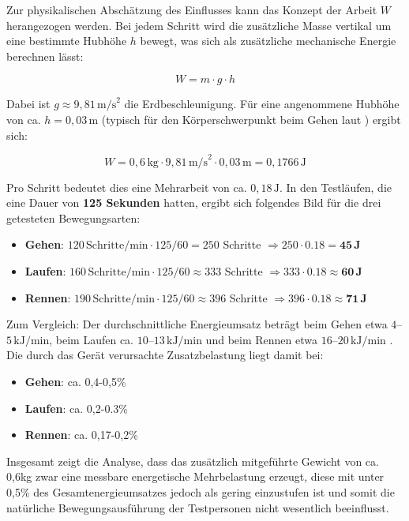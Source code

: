 Zur physikalischen Abschätzung des Einflusses kann das Konzept der Arbeit $W$ herangezogen werden. Bei jedem Schritt wird die zusätzliche Masse vertikal um eine bestimmte Hubhöhe $h$ bewegt, was sich als zusätzliche mechanische Energie berechnen lässt:


\begin{equation}
	W = m \cdot g \cdot h
\end{equation}

Dabei ist $g \approx 9{,}81\,\text{m/s}^2$ die Erdbeschleunigung. Für eine angenommene Hubhöhe von ca. $h = 0{,}03\,\text{m}$ (typisch für den Körperschwerpunkt beim Gehen laut \cite{winter2009biomechanics}) ergibt sich:

\begin{equation*}
	W = 0{,}6\,\text{kg} \cdot 9{,}81\,\text{m/s}^2 \cdot 0{,}03\,\text{m} = 0{,}1766\,\text{J}
\end{equation*}

Pro Schritt bedeutet dies eine Mehrarbeit von ca. $0{,18}\,\text{J}$.
In den Testläufen, die eine Dauer von \textbf{125 Sekunden} hatten, ergibt sich folgendes Bild für die drei getesteten Bewegungsarten:

\begin{itemize}
	\item \textbf{Gehen}: $120\,\text{Schritte/min} \cdot 125/60 = 250$ Schritte $\Rightarrow 250 \cdot 0.18 = \mathbf{45\,\text{J}}$
	\item \textbf{Laufen}: $160\,\text{Schritte/min} \cdot 125/60 \approx 333$ Schritte $\Rightarrow 333 \cdot 0.18 \approx \mathbf{60\,\text{J}}$
	\item \textbf{Rennen}: $190\,\text{Schritte/min} \cdot 125/60 \approx 396$ Schritte $\Rightarrow 396 \cdot 0.18 \approx \mathbf{71\,\text{J}}$
\end{itemize}
\newpage
Zum Vergleich: Der durchschnittliche Energieumsatz beträgt beim Gehen etwa $4$–$5\,\text{kJ/min}$, beim Laufen ca. $10$–$13\,\text{kJ/min}$ und beim Rennen etwa $16$–$20\,\text{kJ/min}$ \cite{margaria1976biomechanics}. Die durch das Gerät verursachte Zusatzbelastung liegt damit bei:

\begin{itemize}
	\item \textbf{Gehen}: ca. 0,4-0,5\%
	\item \textbf{Laufen}: ca. 0,2-0.3\%
	\item \textbf{Rennen}: ca. 0,17-0,2\%
\end{itemize}

Insgesamt zeigt die Analyse, dass das zusätzlich mitgeführte Gewicht von ca. 0,6kg zwar eine messbare energetische Mehrbelastung erzeugt, diese mit unter 0,5\% des Gesamtenergieumsatzes jedoch als gering einzustufen ist und somit die natürliche Bewegungsausführung der Testpersonen nicht wesentlich beeinflusst.



